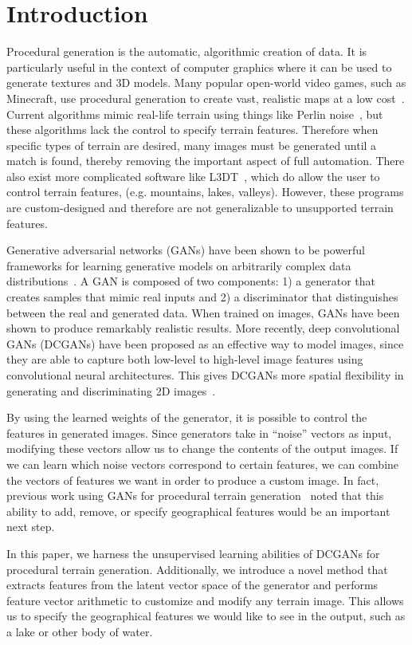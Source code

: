 \documentclass[11pt,twocolumn,letterpaper]{article}
\begin{document}
\section{Introduction}
Procedural generation is the automatic, algorithmic creation of data. It is particularly useful in the context of computer graphics where it can be used to generate textures and 3D models. Many popular open-world video games, such as Minecraft, use procedural generation to create vast, realistic maps at a low cost~\cite{proc-gan}. Current algorithms mimic real-life terrain using things like Perlin noise~\cite{perlin}, but these algorithms lack the control to specify terrain features. Therefore when specific types of terrain are desired, many images must be generated until a match is found, thereby removing the important aspect of full automation. There also exist more complicated software like L3DT~\cite{l3dt}, which do allow the user to control terrain features, (e.g. mountains, lakes, valleys). However, these programs are custom-designed and therefore are not generalizable to unsupported terrain features.

Generative adversarial networks (GANs) have been shown to be powerful frameworks for learning generative models on arbitrarily complex data distributions~\cite{goodfellow}. A GAN is composed of two components: 1) a generator that creates samples that mimic real inputs and 2) a discriminator that distinguishes between the real and generated data. When trained on images, GANs have been shown to produce remarkably realistic results. More recently, deep convolutional GANs (DCGANs) have been proposed as an effective way to model images, since they are able to capture both low-level to high-level image features using convolutional neural architectures. This gives DCGANs more spatial flexibility in generating and discriminating 2D images~\cite{facebook}.

By using the learned weights of the generator, it is possible to control the features in generated images. Since generators take in ``noise'' vectors as input, modifying these vectors allow us to change the contents of the output images. If we can learn which noise vectors correspond to certain features, we can combine the vectors of features we want in order to produce a custom image. In fact, previous work using GANs for procedural terrain generation~\cite{proc-gan} noted that this ability to add, remove, or specify geographical features would be an important next step.

In this paper, we harness the unsupervised learning abilities of DCGANs for procedural terrain generation. Additionally, we introduce a novel method that extracts features from the latent vector space of the generator and performs feature vector arithmetic to customize and modify any terrain image. This allows us to specify the geographical features we would like to see in the output, such as a lake or other body of water.
\end{document}
